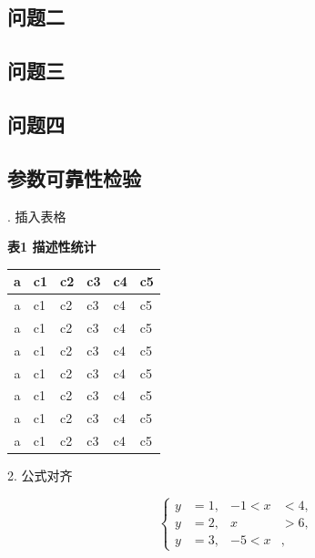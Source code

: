 \documentclass[UTF8]{ctexart}
\begin{document}
\subsection{问题二}
\subsection{问题三}
\subsection{问题四}
\subsection{参数可靠性检验}

. 插入表格
\begin{center}
	\textbf{表1 描述性统计}
	
	\vspace{3pt}
	\begin{tabular}{clllll} %
		\hline %
		a &c1 &c2 &c3 &c4 &c5\\
		\hline
		a &c1 &c2 &c3 &c4 &c5\\
		a &c1 &c2 &c3 &c4 &c5\\
		a &c1 &c2 &c3 &c4 &c5\\
		a &c1 &c2 &c3 &c4 &c5\\
		a &c1 &c2 &c3 &c4 &c5\\
		a &c1 &c2 &c3 &c4 &c5\\
		a &c1 &c2 &c3 &c4 &c5\\
		\hline		
	\end{tabular}
\end{center}

2. 公式对齐

$$
\left\{
\begin{aligned}
y&=1, & -1<x&<4, \\
y&=2, &    x&>6, \\
y&=3, & -5<x&, 
\end{aligned}
\right.
$$
\end{document}
